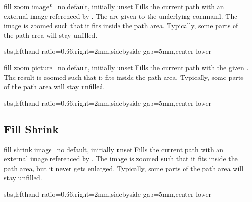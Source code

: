 \documentclass[a4paper,11pt]{article}
\begin{document}
\begin{docTikzKey}{fill zoom image*}{=}{no default, initially unset}
  Fills the current path with an external image referenced by .
  The  are given to the underlying  command.
  The image is zoomed such that it fits inside the path area.
  Typically, some parts of the path area will stay unfilled.
\begin{dispExample*}{sbs,lefthand ratio=0.66,right=2mm,sidebyside gap=5mm,center lower}
\end{dispExample*}
\end{docTikzKey}


\begin{docTikzKey}{fill zoom picture}{=}{no default, initially unset}
  Fills the current path with the given .
  The result is zoomed such that it fits inside the path area.
  Typically, some parts of the path area will stay unfilled.
\begin{dispExample*}{sbs,lefthand ratio=0.66,right=2mm,sidebyside gap=5mm,center lower}
\end{dispExample*}
\end{docTikzKey}


\clearpage
\subsection{Fill Shrink}
\begin{docTikzKey}{fill shrink image}{=}{no default, initially unset}
  Fills the current path with an external image referenced by .
  The image is zoomed such that it fits inside the path area, but it never
  gets enlarged.
  Typically, some parts of the path area will stay unfilled.
\begin{dispExample*}{sbs,lefthand ratio=0.66,right=2mm,sidebyside gap=5mm,center lower}
\end{dispExample*}
\end{docTikzKey}
\end{document}
